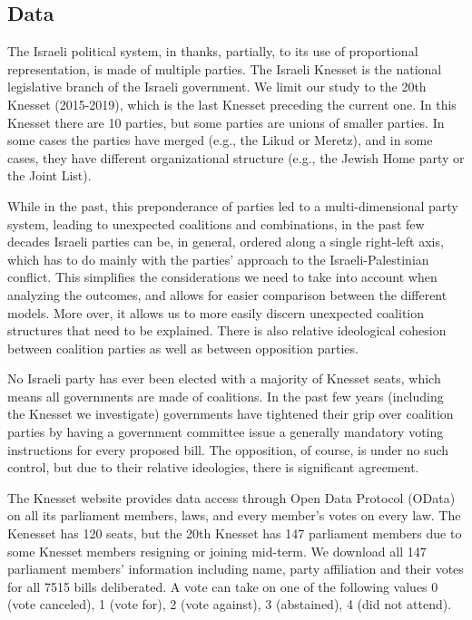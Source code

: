 \documentclass[letterpaper]{article} %
\theoremstyle{definition}
\begin{document}
\subsection{Data} \label{subsec:data}
The Israeli political system, in thanks, partially, to its use of proportional representation, is made of multiple parties. The Israeli Knesset is the national legislative branch of the Israeli government. We limit our study to the 20th Knesset (2015-2019), which is the last Knesset preceding the current one. In this Knesset there are 10 parties, but some parties are unions of smaller parties. In some cases the parties have merged (e.g., the Likud or Meretz), and in some cases, they have different organizational structure (e.g., the Jewish Home party or the Joint List).

While in the past, this preponderance of parties led to a multi-dimensional party system, leading to unexpected coalitions and combinations, in the past few decades Israeli parties can be, in general, ordered along a single right-left axis, which has to do mainly with the parties' approach to the Israeli-Palestinian conflict. This simplifies the considerations we need to take into account when analyzing the outcomes, and allows for easier comparison between the different models.  More over, it allows us to more easily discern unexpected coalition structures that need to be explained. There is also relative ideological cohesion between coalition parties as well as between opposition parties.

No Israeli party has ever been elected with a majority of Knesset seats, which means all governments are made of coalitions. In the past few years (including the Knesset we investigate) governments have tightened their grip over coalition parties by having a government committee issue a generally mandatory voting instructions for every proposed bill. The opposition, of course, is under no such control, but due to their relative ideologies, there is significant agreement.

The Knesset website provides data access through Open Data Protocol (OData) on all its parliament members, laws, and every member's votes on every law. The Kenesset has 120 seats, but the 20th Knesset has 147 parliament members due to some Knesset members resigning or joining mid-term.
We download all 147 parliament members' information including name, party affiliation and their votes for all 7515 bills deliberated. A vote can take on one of the following values 0 (vote canceled), 1 (vote for), 2 (vote against), 3 (abstained), 4 (did not attend). 
\end{document}

